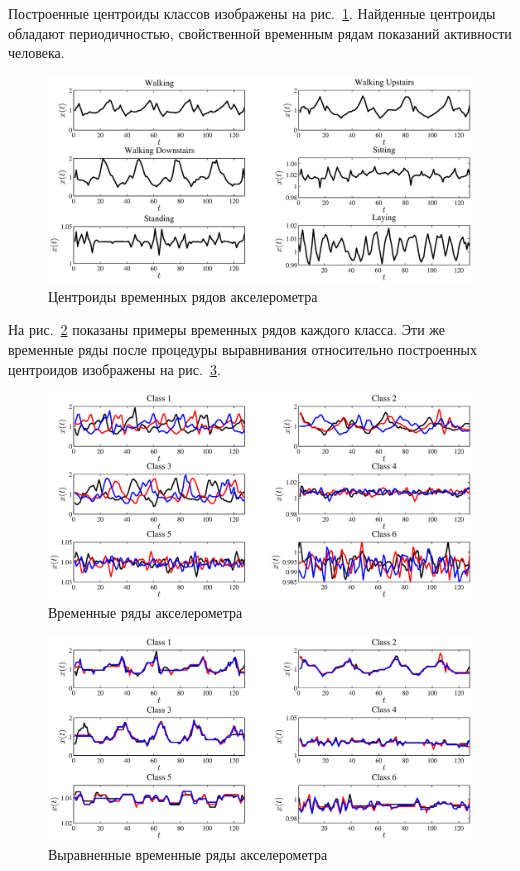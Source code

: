 	Построенные центроиды классов изображены на рис.~\ref{centroids_real}.
	Найденные центроиды обладают периодичностью, свойственной временным рядам показаний активности человека.
	\begin{figure}[ht]
		\centering
		\includegraphics[width=1\linewidth]{figs/ch4/centroids_200_2}
		\caption{Центроиды временных рядов акселерометра}
		\label{centroids_real}
	\end{figure}
	На рис.~\ref{raw_ts} показаны примеры временных рядов каждого класса. Эти же временные ряды после процедуры выравнивания относительно построенных центроидов изображены на рис.~\ref{aligned_ts}.
	\begin{figure}[!ht]
		\centering
		\includegraphics[width=1\linewidth]{figs/ch4/raw_ts}
		\caption{Временные ряды акселерометра}
		\label{raw_ts}
	\end{figure}
	\begin{figure}[!ht]
		\centering
		\includegraphics[width=1\linewidth]{figs/ch4/aligned_ts}
		\caption{Выравненные временные ряды акселерометра}
		\label{aligned_ts}
	\end{figure}
	
